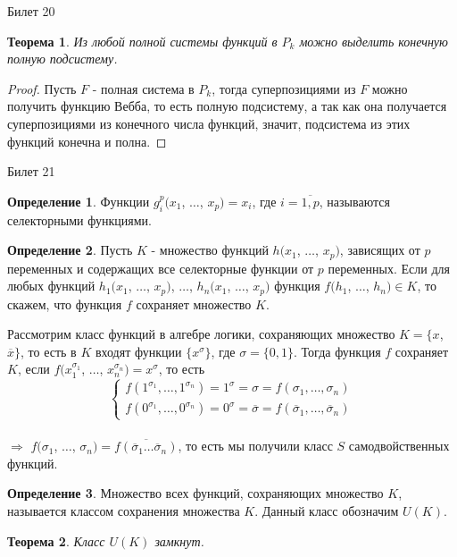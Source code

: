 \documentclass[a4paper, 12pt]{article}
\theoremstyle{definition}
\newtheorem*{definition}{Определение}
\theoremstyle{plain}
\newtheorem*{theorem}{Теорема}
\theoremstyle{remark}
\begin{document}
  \begin{center}
    Билет 20
  \end{center}
  \begin{theorem}
    Из любой полной системы функций в $P_k$ можно выделить конечную полную подсистему.
  \end{theorem}
  \begin{proof}
    Пусть $F$ - полная система в $P_k$, тогда суперпозициями из $F$ можно получить функцию Вебба, то есть полную подсистему, а так как она получается суперпозициями из конечного числа функций, значит, подсистема из этих функций конечна и полна.
  \end{proof}
  \begin{center}
    Билет 21
  \end{center}
  \begin{definition}
    Функции $g_i^p(x_1$, $\ldots$, $x_p)=x_i$, где $i=\overline{1,p}$,  называются селекторными функциями.
  \end{definition}
  \begin{definition}
    Пусть $K$ - множество функций $h(x_1$, $\ldots$, $x_p)$, зависящих от $p$ переменных и содержащих все селекторные функции от $p$ переменных. Если для любых функций $h_1(x_1$, $\ldots$, $x_p)$, $\ldots$, $h_n(x_1$, $\ldots$, $x_p)$ функция $f(h_1$, $\ldots$, $h_n)\in K$, то скажем, что функция $f$ сохраняет множество $K$.
  \end{definition}
  Рассмотрим класс функций в алгебре логики, сохраняющих множество $K=\{x$, $\overline{x}\}$, то есть в $K$ входят функции $\{x^{\sigma}\}$, где $\sigma=\{0, 1\}$. Тогда функция $f$ сохраняет $K$, если $f(x_1^{\sigma_1}$, $\ldots$, $x_n^{\sigma_n})=x^{\sigma}$, то есть
  $$\begin{cases}
    f(1^{\sigma_1}, \ldots, 1^{\sigma_n})=1^{\sigma}=\sigma=f(\sigma_1, \ldots, \sigma_n)\\
    f(0^{\sigma_1}, \ldots, 0^{\sigma_n})=0^{\sigma}=\overline{\sigma}=f(\overline{\sigma}_1, \ldots, \overline{\sigma}_n)
  \end{cases}$$\\
  $\Longrightarrow$ $f(\sigma_1$, $\ldots$, $\sigma_n)=\overline{f(\overline{\sigma}_1 \ldots \overline{\sigma}_n)}$, то есть мы получили класс $S$ самодвойственных функций.
  \begin{definition}
    Множество всех функций, сохраняющих множество $K$, называется классом сохранения множества $K$. Данный класс обозначим $U(K)$.
  \end{definition}
  \begin{theorem}
    Класс $U(K)$ замкнут.
  \end{theorem}
\end{document}

